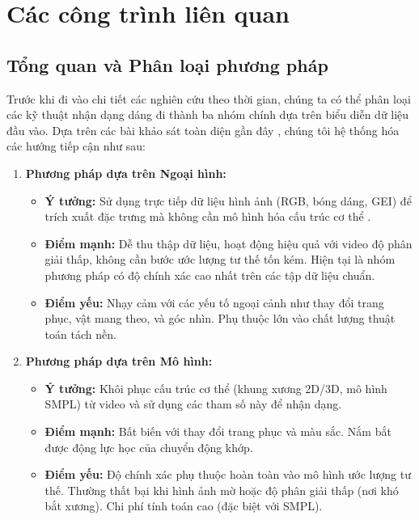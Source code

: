 \chapter{Các công trình liên quan}
\label{Chapter2}

\section{Tổng quan và Phân loại phương pháp}
Trước khi đi vào chi tiết các nghiên cứu theo thời gian, chúng ta có thể phân loại các kỹ thuật nhận dạng dáng đi thành ba nhóm chính dựa trên biểu diễn dữ liệu đầu vào. Dựa trên các bài khảo sát toàn diện gần đây \cite{shen2023comprehensivesurveydeepgait, sepas2022deep}, chúng tôi hệ thống hóa các hướng tiếp cận như sau:

\begin{enumerate}
  \item \textbf{Phương pháp dựa trên Ngoại hình:}
        \begin{itemize}
          \item \textbf{Ý tưởng:} Sử dụng trực tiếp dữ liệu hình ảnh (RGB, bóng dáng, GEI) để trích xuất đặc trưng mà không cần mô hình hóa cấu trúc cơ thể \cite{shen2023comprehensivesurveydeepgait}.
          \item \textbf{Điểm mạnh:} Dễ thu thập dữ liệu, hoạt động hiệu quả với video độ phân giải thấp, không cần bước ước lượng tư thế tốn kém. Hiện tại là nhóm phương pháp có độ chính xác cao nhất trên các tập dữ liệu chuẩn.
          \item \textbf{Điểm yếu:} Nhạy cảm với các yếu tố ngoại cảnh như thay đổi trang phục, vật mang theo, và góc nhìn. Phụ thuộc lớn vào chất lượng thuật toán tách nền.
        \end{itemize}

  \item \textbf{Phương pháp dựa trên Mô hình:}
        \begin{itemize}
          \item \textbf{Ý tưởng:} Khôi phục cấu trúc cơ thể (khung xương 2D/3D, mô hình SMPL\cite{zheng2022gaitrecognitionwilddense}) từ video và sử dụng các tham số này để nhận dạng.
          \item \textbf{Điểm mạnh:} Bất biến với thay đổi trang phục và màu sắc. Nắm bắt được động lực học của chuyển động khớp.
          \item \textbf{Điểm yếu:} Độ chính xác phụ thuộc hoàn toàn vào mô hình ước lượng tư thế. Thường thất bại khi hình ảnh mờ hoặc độ phân giải thấp (nơi khó bắt xương). Chi phí tính toán cao (đặc biệt với SMPL).
        \end{itemize}


\end{enumerate}
